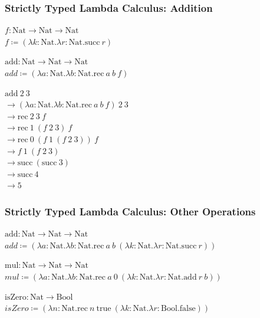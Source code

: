 \documentclass{beamer}
\newcommand{\bool}{\text{Bool}}
\newcommand{\nat}{\text{Nat}}
\newcommand{\true}{\text{true}}
\newcommand{\false}{\text{false}}
\newcommand{\zero}{\text{0}}
\newcommand{\suc}[1]{\text{succ}\ #1}
\newcommand{\rec}[3]{\text{rec}\ #1\ #2\ #3}
\begin{document}
\begin{frame}[fragile]
  \frametitle{Strictly Typed Lambda Calculus: Addition}

  $f : \nat \rightarrow \nat \rightarrow \nat$ \\
  $f \coloneqq (\lambda k: \nat . \lambda r: \nat . \suc{r})$

  \vspace{5mm}

  $\text{add} : \nat \rightarrow \nat \rightarrow \nat$ \\
  $add \coloneqq (\lambda a : \nat . \lambda b : \nat . \rec{a}{b}{f}) $

  \vspace{5mm}

  $\text{add}\ 2\ 3$ \\
  $\rightarrow (\lambda a : \nat . \lambda b : \nat . \rec{a}{b}{f})\ 2\ 3$ \\
  $\rightarrow \rec{2}{3}{f}$ \\
  $\rightarrow \rec{1}{(f\ 2\ 3)}{f}$ \\
  $\rightarrow \rec{\zero}{(f\ 1\ (f\ 2\ 3))}{f}$ \\
  $\rightarrow f\ 1\ (f\ 2\ 3)$ \\
  $\rightarrow \suc{(\suc{3})}$ \\
  $\rightarrow \suc{4}$ \\
  $\rightarrow 5$ \\
\end{frame}

\begin{frame}[fragile]
  \frametitle{Strictly Typed Lambda Calculus: Other Operations}

  $\text{add} : \nat \rightarrow \nat \rightarrow \nat$ \\
  $add \coloneqq (\lambda a : \nat . \lambda b : \nat . \rec{a}{b}{(\lambda k: \nat . \lambda r: \nat . \suc{r})}) $

  \vspace{5mm}

  $\text{mul} : \nat \rightarrow \nat \rightarrow \nat$ \\
  $mul \coloneqq (\lambda a : \nat . \lambda b : \nat . \rec{a}{\zero}{(\lambda k: \nat . \lambda r: \nat . \text{add}\ r\ b)}) $

  \vspace{5mm}

  $\text{isZero} : \nat \rightarrow \bool$ \\
  $isZero \coloneqq (\lambda n : \nat . \rec{n}{\true}{(\lambda k: \nat . \lambda r: \bool . \false)}) $
\end{frame}
\end{document}

